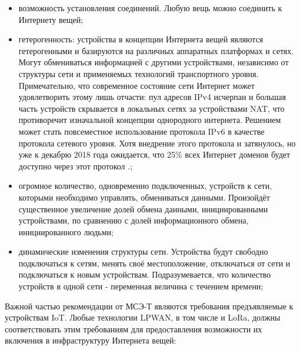 \begin{itemize}
	\item возможность установления соединений. Любую вещь можно соединить к Интернету вещей;
	\item гетерогенность: устройства в концепции Интернета вещей являются гетерогенными и базируются на различных аппаратных платформах и сетях. 
		Могут обмениваться информацией с другими устройствами, независимо от структуры сети и применяемых технологий транспортного уровня. 
		Примечательно, что современное состояние сети Интернет может удовлетворить этому лишь отчасти: пул адресов IPv4 исчерпан и большая часть устройств скрывается в локальных сетях за устройствами NAT, что противоречит изначальной концепции однородного интернета. 
		Решением может стать повсеместное использование протокола IPv6 в качестве протокола сетевого уровня. 
		Хотя внедрение этого протокола и затянулось, но уже к декабрю 2018 года ожидается, что 25\% всех Интернет доменов будет доступно через этот протокол \cite{pickard2017}.;
	\item огромное количество, одновременно подключенных, устройств к сети, которыми необходимо управлять, обмениваться данными. Произойдёт существенное увеличение долей обмена данными, инициированными устройствами, по сравнению с долей информационного обмена, инициированного людьми;
	\item динамические изменения структуры сети. Устройства будут свободно подключаться к сетям, менять своё местоположение, отключаться от сети и подключаться к новым устройствам. Подразумевается, что количество устройств в одной сети - переменная величина с течением времени;
\end{itemize}

Важной частью рекомендации от МСЭ-Т являются требования	предъявляемые к устройствам IoT. Любые технологии LPWAN, в том числе и LoRa, должны соответствовать этим требованиям для предоставления возможности их включения в инфраструктуру Интернета вещей:

